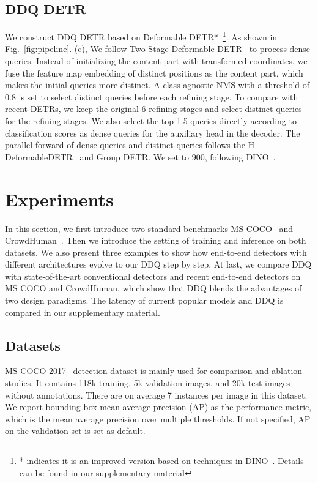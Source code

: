 \documentclass[10pt,twocolumn,letterpaper]{article}
\begin{document}
\subsection{DDQ DETR} We construct DDQ DETR based on Deformable DETR*~\footnote{* indicates it is an improved version based on techniques in DINO~\cite{zhang2022dino}. Details can be found in our supplementary material}. As shown in Fig.~\ref{fig:pipeline}. (c), We follow Two-Stage Deformable DETR~\cite{zhu2020deformable} to process dense queries. Instead of initializing the content part with transformed coordinates, we fuse the feature map embedding of distinct positions as the content part, which makes the initial queries more distinct. A class-agnostic NMS with a threshold of 0.8 is set to select distinct queries before each refining stage. To compare with recent DETRs, we keep the original 6 refining stages and select  distinct queries for the refining stages. We also select the top 1.5 queries directly according to classification scores as dense queries for the auxiliary head in the decoder. The parallel forward of dense queries and distinct queries follows the H-DeformableDETR~\cite{jia2022detrs} and Group DETR\cite{chen2022group}. We set  to 900, following DINO~\cite{zhang2022dino}. \section{Experiments}
\label{sec:results}
In this section, we first introduce two standard benchmarks MS COCO~\cite{lin2014microsoft} and CrowdHuman~\cite{shao2018crowdhuman}. Then we introduce the setting of training and inference on both datasets. We also present three examples to show how  end-to-end detectors with different architectures evolve to our DDQ step by step. At last, we compare DDQ with state-of-the-art conventional detectors and recent end-to-end detectors on MS COCO and CrowdHuman, which show that DDQ blends the advantages of two design paradigms. The latency of current popular models and DDQ is compared in our supplementary material.

\subsection{Datasets}
MS COCO 2017~\cite{lin2014microsoft} detection dataset is mainly used for comparison and ablation studies. It contains 118k training, 5k validation images, and 20k test images without annotations. There are on average 7 instances per image in this dataset. We report bounding box mean average precision (AP) as the performance metric, which is the mean average precision over multiple thresholds. If not specified, AP on the validation set is set as default. 
\end{document}
